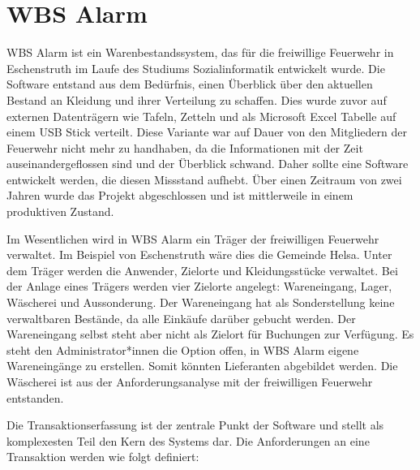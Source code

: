 \section{WBS Alarm}
\label{sec:wbs}

WBS Alarm ist ein Warenbestandssystem, das für die freiwillige Feuerwehr in Eschenstruth im Laufe des Studiums Sozialinformatik entwickelt wurde. Die Software entstand aus dem Bedürfnis, einen Überblick über den aktuellen Bestand an Kleidung und ihrer Verteilung zu schaffen. Dies wurde zuvor auf externen Datenträgern wie Tafeln, Zetteln und als Microsoft Excel Tabelle auf einem USB Stick verteilt. Diese Variante war auf Dauer von den Mitgliedern der Feuerwehr nicht mehr zu handhaben, da die Informationen mit der Zeit auseinandergeflossen sind und der Überblick schwand. Daher sollte eine Software entwickelt werden, die diesen Missstand aufhebt. Über einen Zeitraum von zwei Jahren wurde das Projekt abgeschlossen und ist mittlerweile in einem produktiven Zustand. 

Im Wesentlichen wird in WBS Alarm ein Träger der freiwilligen Feuerwehr verwaltet. Im Beispiel von Eschenstruth wäre dies die Gemeinde Helsa. Unter dem Träger werden die Anwender, Zielorte und Kleidungsstücke verwaltet. Bei der Anlage eines Trägers werden vier Zielorte angelegt: Wareneingang, Lager, Wäscherei und Aussonderung. Der Wareneingang hat als Sonderstellung keine verwaltbaren Bestände, da alle Einkäufe darüber gebucht werden. Der Wareneingang selbst steht aber nicht als Zielort für Buchungen zur Verfügung. Es steht den Administrator*innen die Option offen, in WBS Alarm eigene Wareneingänge zu erstellen. Somit könnten Lieferanten abgebildet werden. Die Wäscherei ist aus der Anforderungsanalyse mit der freiwilligen Feuerwehr entstanden.

Die Transaktionserfassung ist der zentrale Punkt der Software und stellt als komplexesten Teil den Kern des Systems dar. Die Anforderungen an eine Transaktion werden wie folgt definiert: 

